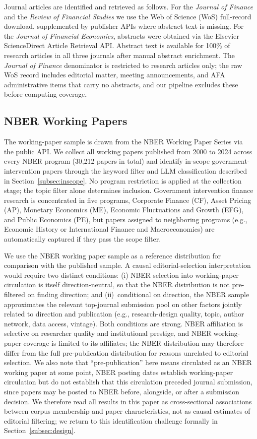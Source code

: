 \documentclass[12pt]{article}
\newcommand{\JF}{\textit{Journal of Finance}}
\newcommand{\RFS}{\textit{Review of Financial Studies}}
\newcommand{\JFE}{\textit{Journal of Financial Economics}}
\begin{document}
Journal articles are identified and retrieved as follows.  For the \JF{} and
the \RFS{} we use the Web of Science (WoS) full-record download, supplemented
by publisher APIs where abstract text is missing.  For the \JFE{}, abstracts
were obtained via the Elsevier ScienceDirect Article Retrieval API.  Abstract
text is available for 100\% of research articles in all three journals after
manual abstract enrichment.  The \JF{} denominator is restricted to research
articles only; the raw WoS record includes editorial matter, meeting
announcements, and AFA administrative items that carry no abstracts, and our
pipeline excludes these before computing coverage.

\subsection{NBER Working Papers}

The working-paper sample is drawn from the NBER Working Paper Series via the
public API.  We collect all working papers published from 2000 to 2024
across every NBER program (30,212 papers in total) and identify in-scope
government-intervention papers through the keyword filter and LLM classification
described in Section~\ref{subsec:inscope}.  No program restriction is
applied at the collection stage; the topic filter alone determines inclusion.
Government intervention finance research is concentrated in five programs, Corporate Finance (CF), Asset Pricing (AP), Monetary Economics (ME), Economic
Fluctuations and Growth (EFG), and Public Economics (PE), but papers assigned
to neighboring programs (e.g., Economic History or International Finance and
Macroeconomics) are automatically captured if they pass the scope filter.

We use the NBER working paper sample as a reference distribution for
comparison with the published sample.  A causal editorial-selection
interpretation would require two distinct conditions: (i) NBER selection
into working-paper circulation is itself direction-neutral, so that the
NBER distribution is not pre-filtered on finding direction; and
(ii)~conditional on direction, the NBER sample approximates the relevant
top-journal submission pool on other factors jointly related to direction
and publication (e.g., research-design quality, topic, author network,
data access, vintage).  Both conditions are strong.  NBER affiliation is
selective on researcher quality and institutional prestige, and NBER
working-paper coverage is limited to its affiliates; the NBER
distribution may therefore differ from the full pre-publication
distribution for reasons unrelated to editorial selection.  We also note
that ``pre-publication'' here means circulated as an NBER working paper
at some point, NBER posting dates establish working-paper circulation
but do not establish that this circulation preceded journal submission,
since papers may be posted to NBER before, alongside, or after a
submission decision.  We therefore read all results in this paper as
cross-sectional associations between corpus membership and paper
characteristics, not as causal estimates of editorial filtering; we
return to this identification challenge formally in
Section~\ref{subsec:design}.
\end{document}
